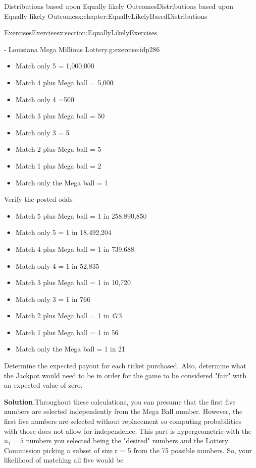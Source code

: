 \documentclass[oneside,10pt,]{book}
\newcommand{\blocktitlefont}{\relax}
\numberwithin{equation}{section}
\begin{document}
\begin{chapterptx}{Distributions based upon Equally likely Outcomes}{}{Distributions based upon Equally likely Outcomes}{}{}{x:chapter:EquallyLikelyBasedDistributions}
\begin{sectionptx}{Exercises}{}{Exercises}{}{}{x:section:EquallyLikelyExercises}
\begin{inlineexercise}{- Louisiana Mega Millions Lottery.}{g:exercise:idp286}
\begin{itemize}[label=\textbullet]
\item{}Match only 5 = \textdollar{}1,000,000%
\item{}Match 4 plus Mega ball = \textdollar{}5,000%
\item{}Match only 4 =\textdollar{}500%
\item{}Match 3 plus Mega ball = \textdollar{}50%
\item{}Match only 3 = \textdollar{}5%
\item{}Match 2 plus Mega ball = \textdollar{}5%
\item{}Match 1 plus Mega ball = \textdollar{}2%
\item{}Match only the Mega ball = \textdollar{}1%
\end{itemize}
%
\par
Verify the posted odds%
\begin{itemize}[label=\textbullet]
\item{}Match 5 plus Mega ball = 1 in 258,890,850%
\item{}Match only 5 = 1 in 18,492,204%
\item{}Match 4 plus Mega ball = 1 in 739,688%
\item{}Match only 4 = 1 in 52,835%
\item{}Match 3 plus Mega ball = 1 in 10,720%
\item{}Match only 3 = 1 in 766%
\item{}Match 2 plus Mega ball = 1 in 473%
\item{}Match 1 plus Mega ball = 1 in 56%
\item{}Match only the Mega ball = 1 in 21%
\end{itemize}
%
\par
Determine the expected payout for each ticket purchased. Also, determine what the Jackpot would need to be in order for the game to be considered "fair" with an expected value of zero.%
\par\smallskip%
\noindent\textbf{\blocktitlefont Solution}.\hypertarget{g:solution:idp287}{}\quad{}Throughout these calculations, you can presume that the first five numbers are selected independently from the Mega Ball number. However, the first five numbers are selected without replacement so computing probabilities with those does not allow for independence. This part is hypergeometric with the \(n_1 = 5\) numbers you selected being the "desired" numbers and the Lottery Commission picking a subset of size r = 5 from the 75 possible numbers.  So, your likelihood of matching all five would be%
\begin{equation*}

\end{equation*}
\end{inlineexercise}
\end{sectionptx}
\end{chapterptx}
\end{document}
